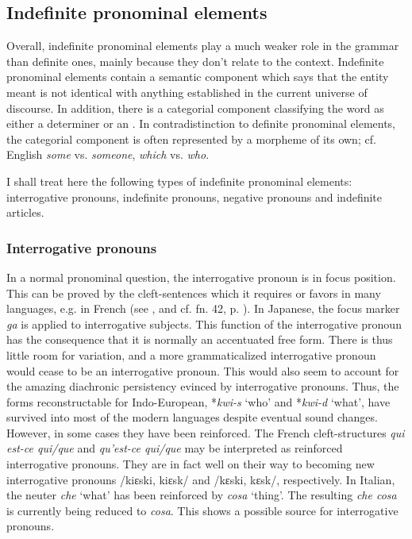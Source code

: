 \subsection{Indefinite pronominal elements}

Overall, indefinite pronominal elements play a much weaker role in the grammar than definite ones, mainly because they don't relate to the context. Indefinite pronominal elements contain a semantic component which says that the entity meant is not identical with anything established in the current universe of discourse. In addition, there is a categorial component classifying the word as either a determiner or an \np. In contradistinction to definite pronominal elements, the categorial component is often represented by a morpheme of its own; cf. English \textit{some} vs. \textit{someone}, \textit{which} vs. \textit{who}.

I shall treat here the following types of indefinite pronominal elements: interrogative pronouns, indefinite pronouns, negative pronouns and indefinite articles.

\subsubsection{Interrogative pronouns}
In a normal pronominal question, the interrogative pronoun is in focus position. This can be proved by the cleft-sentences which it requires or favors in many languages, e.g. in French (see \citealt{Sasse1977b}, and cf. fn. 42, p. \pageref{page125}\chk%
). In Japanese, the focus marker \textit{ga} is applied to interrogative subjects. This function of the interrogative pronoun has the consequence that it is normally an accentuated free form. There is thus little room for variation, and a more grammaticalized interrogative pronoun would cease to be an interrogative pronoun. This would also seem to account for the amazing diachronic persistency evinced by interrogative pronouns. Thus, the forms reconstructable for Indo-European, *\textit{kwi-s} ‘who’ and *\textit{kwi-d} ‘what’, have survived into most of the modern languages despite eventual sound changes. However, in some cases they have been reinforced. The French cleft-structures \textit{qui est-ce qui/que} and \textit{qu'est-ce qui/que} may be interpreted as reinforced interrogative pronouns. They are in fact well on their way to becoming new interrogative pronouns /kiεski, kiεsk/ and /kεski, kεsk/, respectively. In Italian, the neuter \textit{che} ‘what’ has been reinforced by \textit{cosa} ‘thing’. The resulting \textit{che cosa} is currently being reduced to \textit{cosa}. This shows a possible source for interrogative pronouns.

